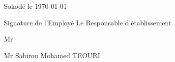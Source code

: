 \documentclass[a4paper, 12pt]{article}
\begin{document}
\begin{flushright}
Sokodé le \today
\end{flushright}\vspace{2mm}



Signature de l'Employé \hspace{6.3cm}  Le Responsable d'établissement


\vspace{3cm}



\begin{minipage}[t]{0.5\textwidth} %
\raggedright %
Mr  
\end{minipage} %
\hfill %
\begin{minipage}[t]{0.4\textwidth} %
\raggedleft %
Mr Sabirou Mohamed TEOURI
  
\end{minipage} %
\end{document}
